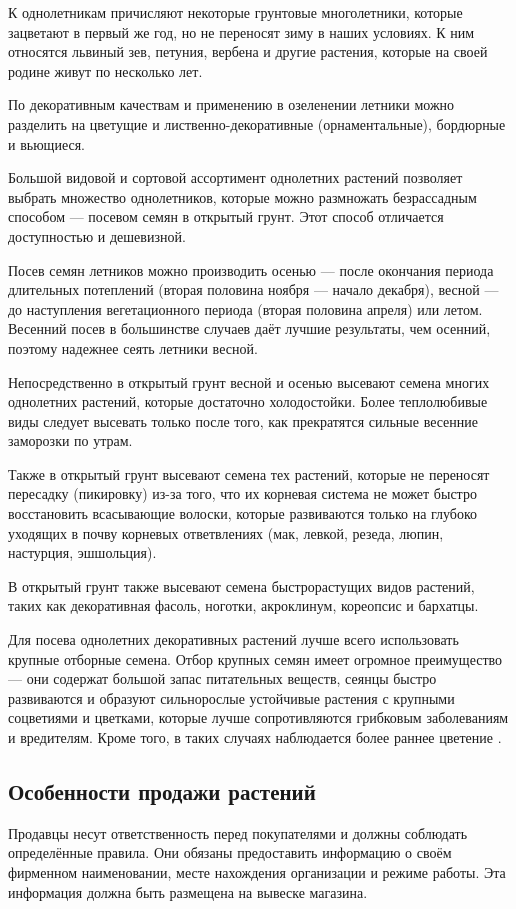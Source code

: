 К однолетникам причисляют некоторые грунтовые многолетники, которые зацветают в первый же год, но не переносят зиму в наших условиях. К ним относятся львиный зев, петуния, вербена и другие растения, которые на своей родине живут по несколько лет.

По декоративным качествам и применению в озеленении летники можно разделить на цветущие и лиственно-декоративные (орнаментальные), бордюрные и вьющиеся.

Большой видовой и сортовой ассортимент однолетних растений позволяет выбрать множество однолетников, которые можно размножать безрассадным способом — посевом семян в открытый грунт. Этот способ отличается доступностью и дешевизной.

Посев семян летников можно производить осенью — после окончания периода длительных потеплений (вторая половина ноября — начало декабря), весной — до наступления вегетационного периода (вторая половина апреля) или летом. Весенний посев в большинстве случаев даёт лучшие результаты, чем осенний, поэтому надежнее сеять летники весной.

Непосредственно в открытый грунт весной и осенью высевают семена многих однолетних растений, которые достаточно холодостойки. Более теплолюбивые виды следует высевать только после того, как прекратятся сильные весенние заморозки по утрам.

Также в открытый грунт высевают семена тех растений, которые не переносят пересадку (пикировку) из-за того, что их корневая система не может быстро восстановить всасывающие волоски, которые развиваются только на глубоко уходящих в почву корневых ответвлениях (мак, левкой, резеда, люпин, настурция, эшшольция).

В открытый грунт также высевают семена быстрорастущих видов растений, таких как декоративная фасоль, ноготки, акроклинум, кореопсис и бархатцы.

Для посева однолетних декоративных растений лучше всего использовать крупные отборные семена. Отбор крупных семян имеет огромное преимущество — они содержат большой запас питательных веществ, сеянцы быстро развиваются и образуют сильнорослые устойчивые растения с крупными соцветиями и цветками, которые лучше сопротивляются грибковым заболеваниям и вредителям. Кроме того, в таких случаях наблюдается более раннее цветение \cite{aleksandrova}.

\subsection{Особенности продажи растений}
Продавцы несут ответственность перед покупателями и должны соблюдать определённые правила. Они обязаны предоставить информацию о своём фирменном наименовании, месте нахождения организации и режиме работы. Эта информация должна быть размещена на вывеске магазина.

